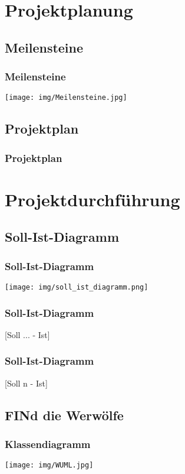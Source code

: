 \documentclass{beamer}
\begin{document}
\section{Projektplanung}

	\subsection{Meilensteine}
\begin{frame}
\frametitle{Meilensteine}
\texttt{[image: img/Meilensteine.jpg]}
\end{frame}

	\subsection{Projektplan}
\begin{frame}
\frametitle{Projektplan}
\vspace{0.3 cm}
\end{frame}

	
\section{Projektdurchführung}

	\subsection{Soll-Ist-Diagramm}
\begin{frame}
\frametitle{Soll-Ist-Diagramm}

\texttt{[image: img/soll\_ist\_diagramm.png]}

\end{frame}

\begin{frame}
\frametitle{Soll-Ist-Diagramm}

[Soll ... - Ist]

\end{frame}

\begin{frame}
\frametitle{Soll-Ist-Diagramm}

[Soll n - Ist]

\end{frame}

	
	\subsection{FINd die Werwölfe}
\begin{frame}
\frametitle{Klassendiagramm}
\texttt{[image: img/WUML.jpg]}
\end{frame}
\end{document}
